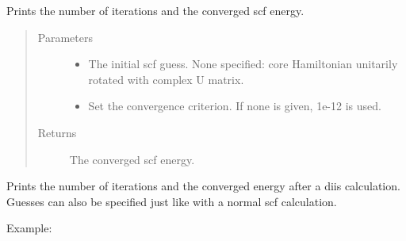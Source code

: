 \documentclass[letterpaper,10pt,english]{sphinxmanual}
\begin{document}
\begin{fulllineitems}
\begin{fulllineitems}
\end{fulllineitems}


\begin{fulllineitems}
\label{\detokenize{Complex_GHF:ghf.complex_GHF.ComplexGHF.get_scf_solution}}
Prints the number of iterations and the converged scf energy.
\begin{quote}\begin{description}
\item[{Parameters}] \leavevmode\begin{itemize}
\item {} 
 \textendash{} The initial scf guess. None specified: core Hamiltonian unitarily rotated with complex U matrix.

\item {} 
 \textendash{} Set the convergence criterion. If none is given, 1e-12 is used.

\end{itemize}

\item[{Returns}] \leavevmode
The converged scf energy.

\end{description}\end{quote}

\end{fulllineitems}


\begin{fulllineitems}
\label{\detokenize{Complex_GHF:ghf.complex_GHF.ComplexGHF.get_scf_solution_diis}}
Prints the number of iterations and the converged energy after a diis calculation. Guesses can also be specified
just like with a normal scf calculation.

Example:


\end{fulllineitems}
\end{fulllineitems}
\end{document}
